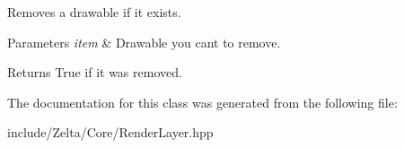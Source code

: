 Removes a drawable if it exists. 


\begin{DoxyParams}{Parameters}
{\em item} & Drawable you cant to remove. \\
\hline
\end{DoxyParams}
\begin{DoxyReturn}{Returns}
True if it was removed. 
\end{DoxyReturn}


The documentation for this class was generated from the following file\+:\begin{DoxyCompactItemize}
\item 
include/\+Zelta/\+Core/Render\+Layer.\+hpp\end{DoxyCompactItemize}
